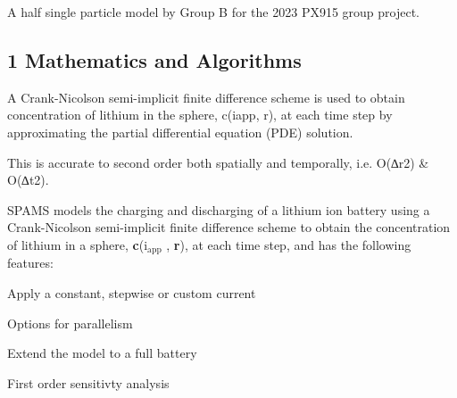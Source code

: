 A half single particle model by Group B for the 2023 P\-X915 group project.

\subsection*{1 Mathematics and Algorithms}

A Crank-\/\-Nicolson semi-\/implicit finite difference scheme is used to obtain concentration of lithium in the sphere, c(iapp, r), at each time step by approximating the partial differential equation (P\-D\-E) solution.

This is accurate to second order both spatially and temporally, i.\-e. O(∆r2) \& O(∆t2).

S\-P\-A\-M\-S models the charging and discharging of a lithium ion battery using a Crank-\/\-Nicolson semi-\/implicit finite difference scheme to obtain the concentration of lithium in a sphere, {\bfseries c}(i$_{\mbox{app}}$ , {\bfseries r}), at each time step, and has the following features\-:
\begin{DoxyItemize}
\item Apply a constant, stepwise or custom current
\item Options for parallelism
\item Extend the model to a full battery
\item First order sensitivty analysis 
\end{DoxyItemize}